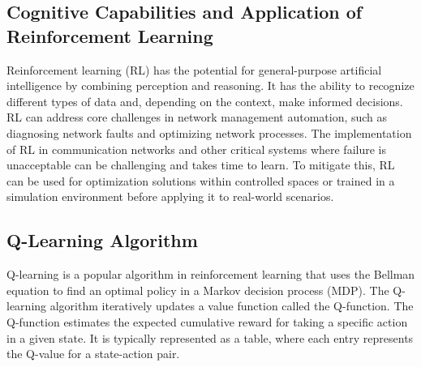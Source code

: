 \subsection{Cognitive Capabilities and Application of Reinforcement Learning}
Reinforcement learning (RL) has the potential for general-purpose artificial intelligence by combining perception and reasoning. It has the ability to recognize different types of data and, depending on the context, make informed decisions. RL can address core challenges in network management automation, such as diagnosing network faults and optimizing network processes. The implementation of RL in communication networks and other critical systems where failure is unacceptable can be challenging and takes time to learn. To mitigate this, RL can be used for optimization solutions within controlled spaces or trained in a simulation environment before applying it to real-world scenarios.
\subsection{Q-Learning Algorithm}
Q-learning is a popular algorithm in reinforcement learning that uses the Bellman equation to find an optimal policy in a Markov decision process (MDP).
The Q-learning algorithm iteratively updates a value function called the Q-function. The Q-function estimates the expected cumulative reward for taking a specific action in a given state. It is typically represented as a table, where each entry represents the Q-value for a state-action pair.

